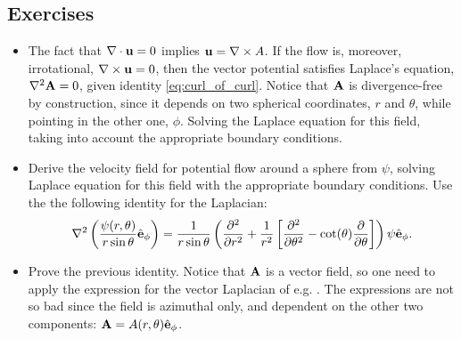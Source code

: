 \subsection{Exercises}

\begin{itemize}
\item \label{ex:u_from_psi_cylinder} 
	The fact that $\nabla\cdot\mathbf{u}=0$ implies $\mathbf{u}=\nabla\times A$. If
	the flow is, moreover, irrotational, $\nabla\times\mathbf{u} = 0$, then
	the vector potential satisfies Laplace's equation, $\nabla^2\mathbf{A}=0$,
	given identity \ref{eq:curl_of_curl}. Notice that $\mathbf{A}$ is divergence-free
	by construction, since it depends on two spherical coordinates,
	$r$ and $\theta$, while pointing in the other one, $\phi$.
	Solving the Laplace  equation for this field, taking into account the
	appropriate boundary conditions.

  
\item \label{ex:u_from_psi_sphere} Derive the velocity field for
  potential flow around a sphere from $\psi$, solving Laplace equation
  for this field with the appropriate boundary conditions. Use the
  the following identity for the Laplacian:
%  
  \begin{equation}
    \label{eq:psi_eq_from_A}
    \nabla^2 \left(  \frac{\psi(r,\theta)}{r \sin\theta } \hat{\mathbf{e}}_\phi \right) =
    \frac{1}{r \sin\theta } 
    \left(
      \frac{\partial^2  }{\partial r^2} +
      \frac{1}{r^2} \left[
        \frac{\partial^2 }{\partial \theta^2} - 
        \cot(\theta) \frac{\partial }{\partial \theta}
      \right]
    \right) \psi \hat{\mathbf{e}}_\phi .
  \end{equation}

\item Prove the previous identity. Notice that $\mathbf{A}$ is a vector
  field, so one need to apply the expression for the vector Laplacian
  of e.g. \cite{wiki:del}. The expressions are not so bad since the
  field is azimuthal only, and dependent on the other two components:
  $ \mathbf{A} = A(r,\theta) \hat{\mathbf{e}}_\phi$.


\end{itemize}
